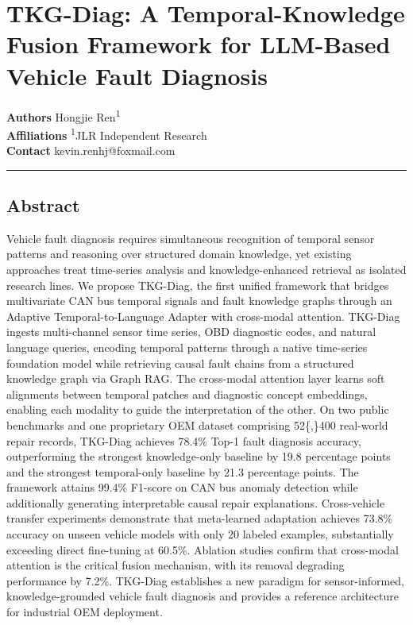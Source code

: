 \documentclass[
  11pt,
]{article}
\author{}
\date{}
\begin{document}
\section{TKG-Diag: A Temporal-Knowledge Fusion Framework for LLM-Based
Vehicle Fault
Diagnosis}\label{tkg-diag-a-temporal-knowledge-fusion-framework-for-llm-based-vehicle-fault-diagnosis}

\textbf{Authors} Hongjie Ren\textsuperscript{1}\\
\textbf{Affiliations} \textsuperscript{1}JLR Independent Research\\
\textbf{Contact} kevin.renhj@foxmail.com

\begin{center}\rule{0.5\linewidth}{0.5pt}\end{center}

\subsection{Abstract}\label{abstract}

Vehicle fault diagnosis requires simultaneous recognition of temporal
sensor patterns and reasoning over structured domain knowledge, yet
existing approaches treat time-series analysis and knowledge-enhanced
retrieval as isolated research lines. We propose TKG-Diag, the first
unified framework that bridges multivariate CAN bus temporal signals and
fault knowledge graphs through an Adaptive Temporal-to-Language Adapter
with cross-modal attention. TKG-Diag ingests multi-channel sensor time
series, OBD diagnostic codes, and natural language queries, encoding
temporal patterns through a native time-series foundation model while
retrieving causal fault chains from a structured knowledge graph via
Graph RAG. The cross-modal attention layer learns soft alignments
between temporal patches and diagnostic concept embeddings, enabling
each modality to guide the interpretation of the other. On two public
benchmarks and one proprietary OEM dataset comprising 52\{,\}400
real-world repair records, TKG-Diag achieves 78.4\% Top-1 fault
diagnosis accuracy, outperforming the strongest knowledge-only baseline
by 19.8 percentage points and the strongest temporal-only baseline by
21.3 percentage points. The framework attains 99.4\% F1-score on CAN bus
anomaly detection while additionally generating interpretable causal
repair explanations. Cross-vehicle transfer experiments demonstrate that
meta-learned adaptation achieves 73.8\% accuracy on unseen vehicle
models with only 20 labeled examples, substantially exceeding direct
fine-tuning at 60.5\%. Ablation studies confirm that cross-modal
attention is the critical fusion mechanism, with its removal degrading
performance by 7.2\%. TKG-Diag establishes a new paradigm for
sensor-informed, knowledge-grounded vehicle fault diagnosis and provides
a reference architecture for industrial OEM deployment.
\end{document}
